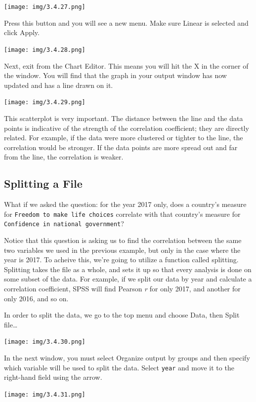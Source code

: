 \documentclass[
]{book}
\begin{document}
\texttt{[image: img/3.4.27.png]}

Press this button and you will see a new menu. Make sure {Linear} is selected and click {Apply}.

\texttt{[image: img/3.4.28.png]}

Next, exit from the Chart Editor. This means you will hit the {X} in the corner of the window. You will find that the graph in your output window has now updated and has a line drawn on it.

\texttt{[image: img/3.4.29.png]}

This scatterplot is very important. The distance between the line and the data points is indicative of the strength of the correlation coefficient; they are directly related. For example, if the data were more clustered or tighter to the line, the correlation would be stronger. If the data points are more spread out and far from the line, the correlation is weaker.

\hypertarget{splitting-a-file}{%
\subsection{Splitting a File}\label{splitting-a-file}}

What if we asked the question: for the year 2017 only, does a country's measure for \texttt{Freedom\ to\ make\ life\ choices} correlate with that country's measure for \texttt{Confidence\ in\ national\ government}?

Notice that this question is asking us to find the correlation between the same two variables we used in the previous example, but only in the case where the year is 2017. To acheive this, we're going to utilize a function called splitting. Splitting takes the file as a whole, and sets it up so that every analysis is done on some subset of the data. For example, if we split our data by year and calculate a correlation coefficient, SPSS will find Pearson \emph{r} for only 2017, and another for only 2016, and so on.

In order to split the data, we go to the top menu and choose {Data}, then {Split file\ldots{}}

\texttt{[image: img/3.4.30.png]}

In the next window, you must select {Organize output by groups} and then specify which variable will be used to split the data. Select \texttt{year} and move it to the right-hand field using the arrow.

\texttt{[image: img/3.4.31.png]}
\end{document}
